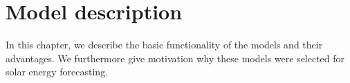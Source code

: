 \chapter{Model description}
\label{ch:model-description}

In this chapter, we describe the basic functionality of the models 
and their advantages.
We furthermore give motivation why these models were selected 
for solar energy forecasting. 






